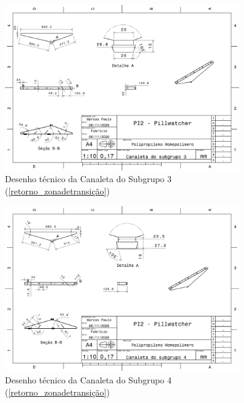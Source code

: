 \begin{apendicesenv}
\begin{figure}[H]
    \centering
    \includegraphics[width=0.9\textwidth]{figuras/estrutura/Desenhos/Canaleta_S3.pdf}
    \caption{Desenho técnico da Canaleta do Subgrupo 3 (\ref{retorno_zonadetransição})}
    \label{fig:canaletaS3}
\end{figure}

\begin{figure}[H]
    \centering
    \includegraphics[width=0.9\textwidth]{figuras/estrutura/Desenhos/Canaleta_s4.pdf}
    \caption{Desenho técnico da Canaleta do Subgrupo 4 (\ref{retorno_zonadetransição})}
    \label{fig:canaletaS4}
\end{figure}


\end{apendicesenv}
